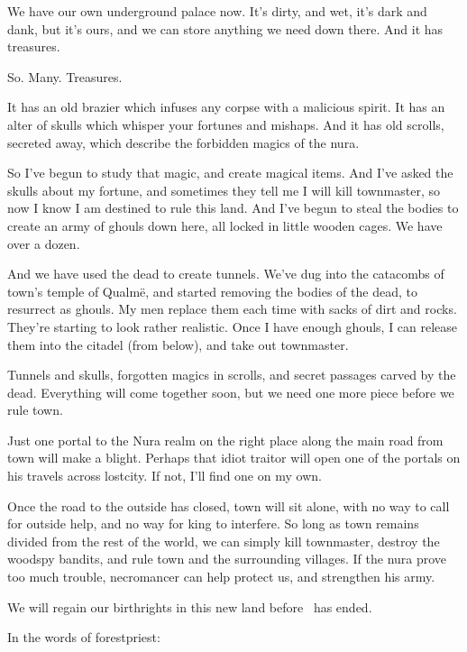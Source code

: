 \begin{multicols}{2}
\begin{exampletext}
  We have our own underground palace now.
  It's dirty, and wet, it's dark and dank, but it's ours, and we can store anything we need down there.
  And it has treasures.

  So. Many. Treasures.

  It has an old brazier which infuses any corpse with a malicious spirit.
  It has an alter of skulls which whisper your fortunes and mishaps.
  And it has old scrolls, secreted away, which describe the forbidden magics of the nura.
  
  So I've begun to study that magic, and create magical items.
  And I've asked the skulls about my fortune, and sometimes they tell me I will kill \gls{townmaster}, so now I know I am destined to rule this land.
  And I've begun to steal the bodies to create an army  of ghouls down here, all locked in little wooden cages.
  We have over a dozen.

  And we have used the dead to create tunnels.
  We've dug into the catacombs of \gls{town}'s temple of Qualm\"{e}, and started removing the bodies of the dead, to resurrect as ghouls.
  My men replace them each time with sacks of dirt and rocks.
  They're starting to look rather realistic.
  Once I have enough ghouls, I can release them into the citadel (from below), and take out \gls{townmaster}.

  Tunnels and skulls, forgotten magics in scrolls, and secret passages carved by the dead.
  Everything will come together soon, but we need one more piece before we rule \gls{town}.

  Just one portal to the Nura realm on the right place along the main road from \gls{town} will make a \gls{blight}.
  Perhaps that idiot \gls{traitor} will open one of the portals on his travels across \gls{lostcity}.
  If not, I'll find one on my own.

  Once the road to the outside has closed, \gls{town} will sit alone, with no way to call for outside help, and no way for \gls{king} to interfere.
  So long as \gls{town} remains divided from the rest of the world, we can simply kill \gls{townmaster}, destroy the woodspy bandits, and rule \gls{town} and the surrounding villages.
  If the nura prove too much trouble, \gls{necromancer} can help protect us, and strengthen his army.

  We will regain our birthrights in this new land before \season\ has ended.

\end{exampletext}

In the words of \gls{forestpriest}:


\end{multicols}
